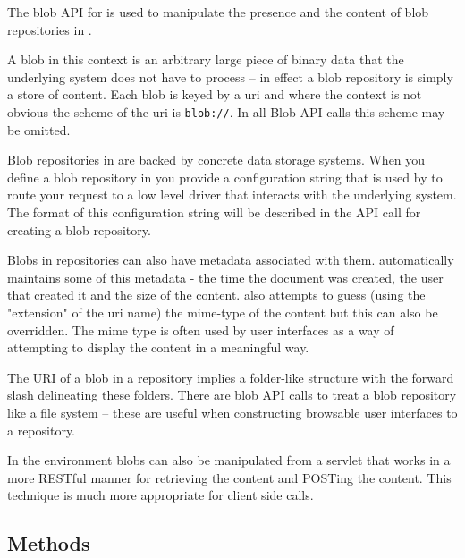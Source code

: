 
The blob API for \Rapture is used to manipulate the presence and the content of
blob repositories in \Rapture.

A blob in this context is an arbitrary large piece of binary data that the underlying
\Rapture system does not have to process -- in effect a blob repository is simply a store
of content. Each blob is keyed by a \Rapture uri and where the context is not obvious the scheme
of the uri is \verb+blob://+. In all Blob API calls this scheme may be omitted.

Blob repositories in \Rapture are backed by concrete data storage systems. When
you define a blob repository in \Rapture you provide a configuration string that is used
by \Rapture to route your request to a low level driver that interacts with the
underlying system. The format of this configuration string will be described in
the API call for creating a blob repository.

Blobs in repositories can also have metadata associated with them. \Rapture
automatically maintains some of this metadata - the time the document was created, the
user that created it and the size of the content. \Rapture also attempts to guess (using the
"extension" of the uri name) the mime-type of the content but this can also be overridden. The
mime type is often used by user interfaces as a way of attempting to display the content in a
meaningful way.

The URI of a blob in a repository implies a folder-like structure with the
forward slash delineating these folders. There are blob API calls to treat a
blob repository like a file system -- these are useful when constructing
browsable user interfaces to a repository.

In the \Rapture environment blobs can also be manipulated from a servlet that works in a more
RESTful manner for retrieving the content and POSTing the content. This technique is much more
appropriate for client side calls.

\subsection{Methods}
